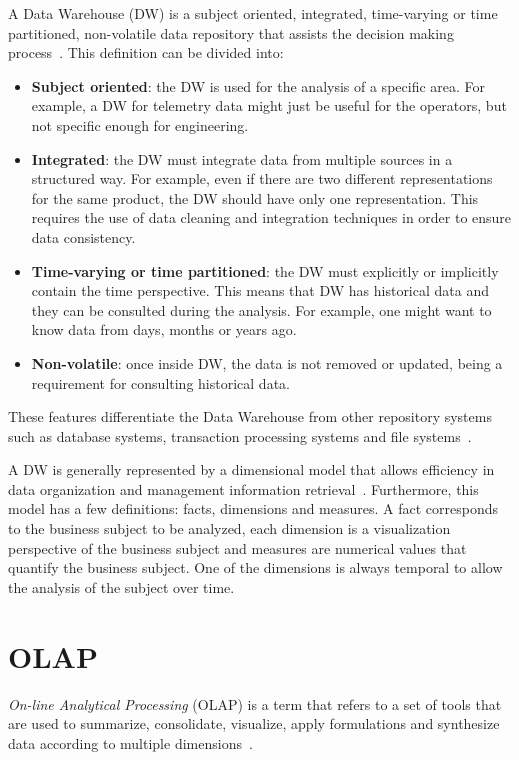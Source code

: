 A Data Warehouse (DW) is a subject oriented, integrated, time-varying or time partitioned, non-volatile data repository that assists the decision making process~\cite{inmonUsingDataWarehouse1994}.
This definition can be divided into:

\begin{itemize}
  \item \textbf{Subject oriented}: the DW is used for the analysis of a specific area.
    For example, a DW for telemetry data might just be useful for the operators, but not specific enough for engineering.
  \item \textbf{Integrated}: the DW must integrate data from multiple sources in a structured way.
    For example, even if there are two different representations for the same product, the DW should have only one representation.
    This requires the use of data cleaning and integration techniques in order to ensure data consistency.
  \item \textbf{Time-varying or time partitioned}: the DW must explicitly or implicitly contain the time perspective.
    This means that DW has historical data and they can be consulted during the analysis.
    For example, one might want to know data from days, months or years ago.
  \item \textbf{Non-volatile}: once inside DW, the data is not removed or updated, being a requirement for consulting historical data.
\end{itemize}

These features differentiate the Data Warehouse from other repository systems such as database systems, transaction processing systems and file systems~\cite{hanDataMiningConcepts2011}.

A DW is generally represented by a dimensional model that allows efficiency in data organization and management information retrieval~\cite{kimballDataWarehouseToolkit2013}.
Furthermore, this model has a few definitions: facts, dimensions and measures.
A fact corresponds to the business subject to be analyzed, each dimension is a visualization perspective of the business subject and measures are numerical values that quantify the business subject.
One of the dimensions is always temporal to allow the analysis of the subject over time.

\section{OLAP}\label{ch:fun:olap}

\textit{On-line Analytical Processing} (OLAP) is a term that refers to a set of tools that are used to summarize, consolidate, visualize, apply formulations and synthesize data according to multiple dimensions~\cite{coddProvidingOlapUseranalysts1998}.

